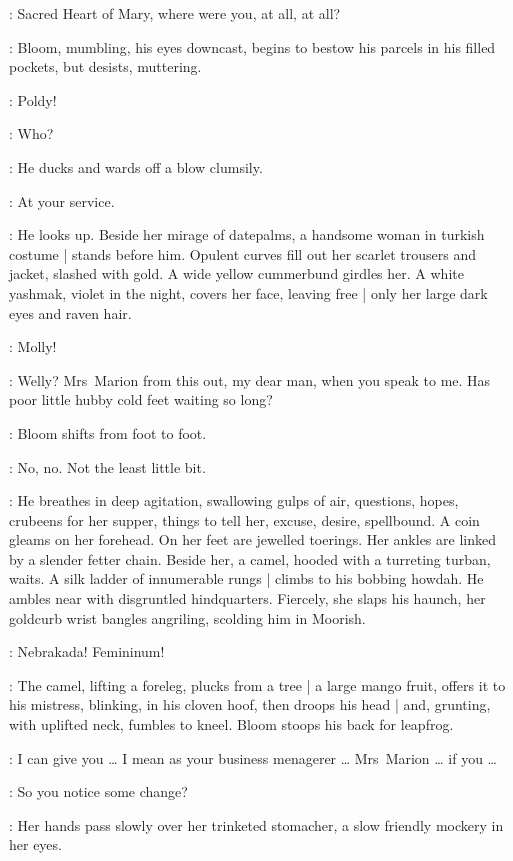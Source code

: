 \Ellen:
Sacred Heart of Mary,
where were you,
at all,
at all?

:
Bloom,
mumbling,
his eyes downcast,
begins to bestow his parcels in his filled pockets,
but desists,
muttering.

\Marion:
Poldy!

\Bloom:
Who?

:
He ducks and wards off a blow clumsily.

\Bloom:
At your service.

:
He looks up.
Beside her mirage of datepalms,
a handsome woman in turkish costume |
stands before him.
Opulent curves fill out her scarlet trousers and jacket,
slashed with gold.
A wide yellow cummerbund girdles her.
A white yashmak,
violet in the night,
covers her face,
leaving free |
only her large dark eyes and raven hair.

\Bloom:
Molly!

\Marion[1]:
Welly?
Mrs~Marion from this out,
my dear man,
when you speak to me.
Has poor little hubby cold feet waiting so long?

:
Bloom shifts from foot to foot.

\Bloom:
No,
no.
Not the least little bit.

:
He breathes in deep agitation,
swallowing gulps of air,
questions,
hopes,
crubeens for her supper,
things to tell her,
excuse,
desire,
spellbound.
A coin gleams on her forehead.
On her feet are jewelled toerings.
Her ankles are linked by a slender fetter chain.
Beside her,
a camel,
hooded with a turreting turban,
waits.
A silk ladder of innumerable rungs |
climbs to his bobbing howdah.
He ambles near with disgruntled hindquarters.
Fiercely,
she slaps his haunch,
her goldcurb wrist bangles angriling,
scolding him in Moorish.

\Marion:
Nebrakada!
Femininum!

:
The camel,
lifting a foreleg,
plucks from a tree |
a large mango fruit,
offers it to his mistress,
blinking,
in his cloven hoof,
then droops his head |
and,
grunting,
with uplifted neck,
fumbles to kneel.
Bloom stoops his back for leapfrog.

\Bloom:
I can give you \ldots
I mean as your business menagerer \ldots
Mrs~Marion \ldots
if you \ldots

\Marion:
So you notice some change?

:
Her hands pass slowly over her trinketed stomacher,
a slow friendly mockery in her eyes.

